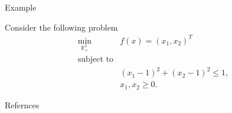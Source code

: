 \documentclass[10pt,xcolor={table,dvipsnames},t,unknownkeysallowed]{beamer}
\newcommand{\R}{\mathbb{R}}
\begin{document}
\begin{frame}{Example}
 \begin{example}
    Consider the following problem
    \begin{equation}\label{example}
        \begin{array}{ll}
             \min_{\R^2_+}& f(x)=(x_1,x_2)^T  \\
             \text{subject to}& \\
             & (x_1-1)^2+(x_2-1)^2\leq 1,\\
             & x_1,x_2\geq 0.
        \end{array}
    \end{equation}
 \end{example}
    
\end{frame}

\begin{frame}{Refernces}
    \printbibliography
   \nocite{*}
\end{frame}
\end{document}
